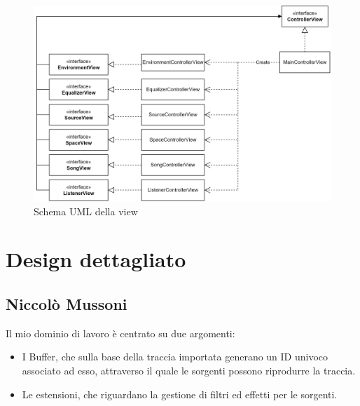 \documentclass[a4paper,12pt]{report}
\begin{document}
\begin{figure}[H]
\centering{}
\includegraphics[width=\textwidth]{img/architecture/view.png}
\caption{Schema UML della view}
\label{img:analysis}
\end{figure}

\section{Design dettagliato}
\subsection*{Niccolò Mussoni}
Il mio dominio di lavoro è centrato su due argomenti:
\begin{itemize}
	\item I Buffer, che sulla base della traccia importata generano un ID univoco associato ad esso, attraverso il quale le sorgenti possono riprodurre la traccia. 
	\item Le estensioni, che riguardano la gestione di filtri ed effetti per le sorgenti.
\end{itemize}
%
\end{document}
